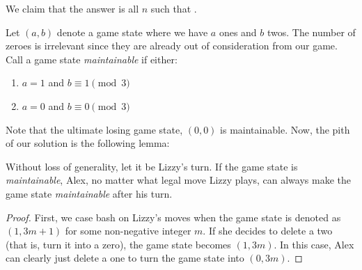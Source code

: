 \documentclass[10pt]{../usamts}
\begin{document}
\begin{solution}
We claim that the answer is all $n$ such that .

Let $(a,b)$ denote a game state where we have $a$ ones and $b$ twos. The number of zeroes is irrelevant since they are already out of consideration from our game.
Call a game state \textit{maintainable} if either:
\begin{enumerate}
    \item $a = 1$ and $b \equiv 1 \pmod 3$
    \item $a = 0$ and $b \equiv 0 \pmod 3$
\end{enumerate}

Note that the ultimate losing game state, $(0,0)$ is maintainable. Now, the pith of our solution is the following lemma:
\begin{claim}
    Without loss of generality, let it be Lizzy's turn. If the game state is \textit{maintainable}, Alex, no matter what legal move Lizzy plays, can always make the game state \textit{maintainable} after his turn.
\end{claim}
\begin{proof}
    First, we case bash on Lizzy's moves when the game state is denoted as $(1, 3m+1)$ for some non-negative integer $m$.
    If she decides to delete a two (that is, turn it into a zero), the game state becomes $(1, 3m)$. In this case, Alex can clearly just delete a one to turn the game state into $(0,3m)$.


\end{proof}
\end{solution}
\end{document}

